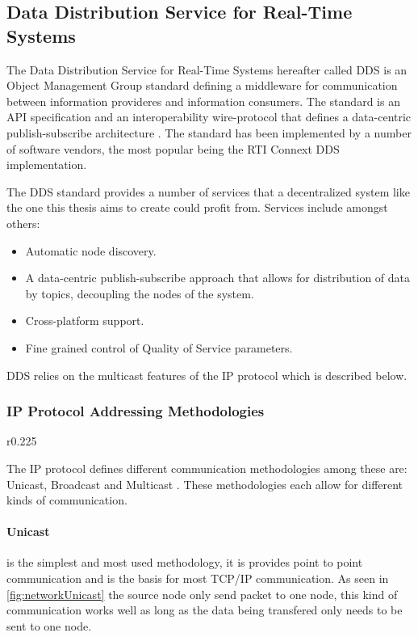 \subsection{Data Distribution Service for Real-Time Systems}
The Data Distribution Service for Real-Time Systems hereafter called DDS is an Object Management Group standard defining a middleware for communication between information provideres and information consumers.
The standard is an API specification and an interoperability wire-protocol that defines a data-centric publish-subscribe architecture \cite{pardo2003omg}.
The standard has been implemented by a number of software vendors, the most popular being the RTI Connext DDS implementation.

The DDS standard provides a number of services that a decentralized system like the one this thesis aims to create could profit from.
Services include amongst others:

\begin{itemize}
	\item Automatic node discovery.
	\item A data-centric publish-subscribe approach that allows for distribution of data by topics, decoupling the nodes of the system.
	\item Cross-platform support.
	\item Fine grained control of Quality of Service parameters.
\end{itemize}

DDS relies on the multicast features of the IP protocol which is described below.

\subsubsection{IP Protocol Addressing Methodologies}

\begin{wrapfigure}{r}{0.225\textwidth}
	\vspace{-20pt}
	
	\vspace{-10pt}
\end{wrapfigure}

The IP protocol defines different communication methodologies among these are: Unicast, Broadcast \cite{RFC0919_Broadcast} and Multicast \cite{RFC1112_Multicast_IGMPv1}.
These methodologies each allow for different kinds of communication.

\paragraph{Unicast} is the simplest and most used methodology, it is provides point to point communication and is the basis for most TCP/IP communication.
As seen in \cref{fig:networkUnicast} the source node only send packet to one node, this kind of communication works well as long as the data being transfered only needs to be sent to one node.

